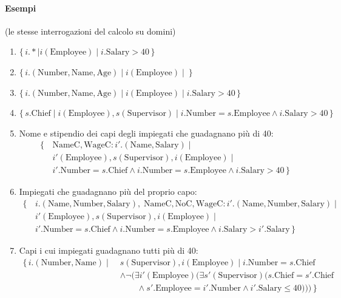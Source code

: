 \documentclass[a4paper,12pt]{article}
\begin{document}
\paragraph{Esempi} (le stesse interrogazioni del calcolo su domini)
\begin{enumerate}
  \item[0a.] $\{\, i.* \mid i(\text{Employee}) \mid i.\text{Salary} > 40 \,\}$
  \item[0b.] $\{\, i.(\text{Number}, \text{Name}, \text{Age}) \mid
    i(\text{Employee}) \mid \ \}$
  \item[1.] $\{\, i.(\text{Number}, \text{Name}, \text{Age}) \mid
    i(\text{Employee}) \mid i.\text{Salary} > 40 \,\}$
  \item[2.] $\{\, s.\text{Chief} \mid i(\text{Employee}), s(\text{Supervisor})
    \mid i.\text{Number} = s.\text{Employee} \wedge i.\text{Salary} > 40 \,\}$
  \item[3.] Nome e stipendio dei capi degli impiegati che guadagnano più
    di 40:
    \begin{align*}
      \{\, & \text{NameC}, \text{WageC}: i'.(\text{Name}, \text{Salary}) \mid\\
      & i'(\text{Employee}), s(\text{Supervisor}), i(\text{Employee}) \mid\\
      & i'.\text{Number} = s.\text{Chief} \wedge
        i.\text{Number} = s.\text{Employee} \wedge i.\text{Salary} > 40 \,\}
    \end{align*}
  \item[4.] Impiegati che guadagnano più del proprio capo:
    \begin{align*}
      \{\, & i.(\text{Name}, \text{Number}, \text{Salary}),\;
        \text{NameC}, \text{NoC}, \text{WageC}:
        i'.(\text{Name}, \text{Number}, \text{Salary}) \mid\\
      & i'(\text{Employee}), s(\text{Supervisor}), i(\text{Employee}) \mid\\
      & i'.\text{Number} = s.\text{Chief} \wedge
        i.\text{Number} = s.\text{Employee} \wedge
        i.\text{Salary} > i'.\text{Salary} \,\}
    \end{align*}
  \item[5.] Capi i cui impiegati guadagnano tutti più di 40:
    \begin{align*}
      \{\, i.(\text{Number}, \text{Name}) \mid\;
      & s(\text{Supervisor}), i(\text{Employee}) \mid
        i.\text{Number} = s.\text{Chief}\\
      & \wedge \neg(\exists i'(\text{Employee})(\exists s'(\text{Supervisor})
        (s.\text{Chief} = s'.\text{Chief}\\
      & \qquad \wedge s'.\text{Employee} = i'.\text{Number}
        \wedge i'.\text{Salary} \leq 40))) \,\}
    \end{align*}
\end{enumerate}
\end{document}

